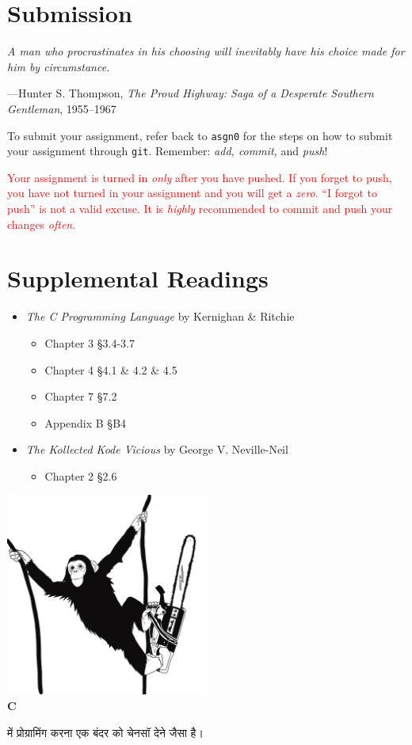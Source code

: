 \documentclass[11pt]{article}
\begin{document}
\section{Submission}

\epigraph{\emph{A man who procrastinates in his choosing will inevitably have his choice made for him by circumstance.}}
{---Hunter S. Thompson, \emph{The Proud Highway: Saga of a Desperate Southern Gentleman}, 1955--1967}

To submit your assignment, refer back to \texttt{asgn0} for the steps on how to
submit your assignment through \texttt{git}. Remember: \emph{add, commit,} and
\emph{push}!

\textcolor{red}{Your assignment is turned in \emph{only} after you have pushed.
If you forget to push, you have not turned in your assignment and you will get a
\emph{zero}. ``I forgot to push'' is not a valid excuse. It is \emph{highly}
recommended to commit and push your changes \emph{often}.}


\section{Supplemental Readings}

\begin{itemize}
  \item \textit{The C Programming Language} by Kernighan \& Ritchie
  \begin{itemize}
    \item Chapter 3 \S 3.4-3.7
    \item Chapter 4 \S 4.1 \& 4.2 \& 4.5
    \item Chapter 7 \S 7.2
    \item Appendix B \S B4
  \end{itemize}

  \item \textit{The Kollected Kode Vicious } by George V. Neville-Neil
  \begin{itemize}
      \item Chapter 2 \S 2.6
  \end{itemize}
\end{itemize}

\begin{center}
\includegraphics[width=0.5\textwidth]{../../images/monkey-chainsaw.jpg}\\
\textbf{C}
\begin{hindi}
 में प्रोग्रामिंग करना एक बंदर को चेनसॉ देने जैसा है।
\end{hindi}

\end{center}
\end{document}
